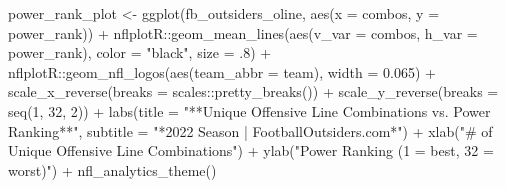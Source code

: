 \documentclass[
  letterpaper,
]{krantz}
\newenvironment{Shaded}{\begin{snugshade}}{\end{snugshade}}
\newcommand{\AttributeTok}[1]{\textcolor[rgb]{0.40,0.45,0.13}{#1}}
\newcommand{\DecValTok}[1]{\textcolor[rgb]{0.68,0.00,0.00}{#1}}
\newcommand{\FloatTok}[1]{\textcolor[rgb]{0.68,0.00,0.00}{#1}}
\newcommand{\FunctionTok}[1]{\textcolor[rgb]{0.28,0.35,0.67}{#1}}
\newcommand{\NormalTok}[1]{\textcolor[rgb]{0.00,0.23,0.31}{#1}}
\newcommand{\OtherTok}[1]{\textcolor[rgb]{0.00,0.23,0.31}{#1}}
\newcommand{\SpecialCharTok}[1]{\textcolor[rgb]{0.37,0.37,0.37}{#1}}
\newcommand{\StringTok}[1]{\textcolor[rgb]{0.13,0.47,0.30}{#1}}
\begin{document}
\begin{Shaded}
\begin{Highlighting}[]
\NormalTok{power\_rank\_plot }\OtherTok{\textless{}{-}} \FunctionTok{ggplot}\NormalTok{(fb\_outsiders\_oline,}
                          \FunctionTok{aes}\NormalTok{(}\AttributeTok{x =}\NormalTok{ combos, }\AttributeTok{y =}\NormalTok{ power\_rank)) }\SpecialCharTok{+}
\NormalTok{  nflplotR}\SpecialCharTok{::}\FunctionTok{geom\_mean\_lines}\NormalTok{(}\FunctionTok{aes}\NormalTok{(}\AttributeTok{v\_var =}\NormalTok{ combos,}
                                \AttributeTok{h\_var =}\NormalTok{ power\_rank),}
                            \AttributeTok{color =} \StringTok{"black"}\NormalTok{,}
                            \AttributeTok{size =}\NormalTok{ .}\DecValTok{8}\NormalTok{) }\SpecialCharTok{+}
\NormalTok{  nflplotR}\SpecialCharTok{::}\FunctionTok{geom\_nfl\_logos}\NormalTok{(}\FunctionTok{aes}\NormalTok{(}\AttributeTok{team\_abbr =}\NormalTok{ team), }\AttributeTok{width =} \FloatTok{0.065}\NormalTok{) }\SpecialCharTok{+}
  \FunctionTok{scale\_x\_reverse}\NormalTok{(}\AttributeTok{breaks =}\NormalTok{ scales}\SpecialCharTok{::}\FunctionTok{pretty\_breaks}\NormalTok{()) }\SpecialCharTok{+}
  \FunctionTok{scale\_y\_reverse}\NormalTok{(}\AttributeTok{breaks =} \FunctionTok{seq}\NormalTok{(}\DecValTok{1}\NormalTok{, }\DecValTok{32}\NormalTok{, }\DecValTok{2}\NormalTok{)) }\SpecialCharTok{+}
  \FunctionTok{labs}\NormalTok{(}\AttributeTok{title =} \StringTok{"**Unique Offensive Line Combinations vs.}
\StringTok{       Power Ranking**"}\NormalTok{,}
       \AttributeTok{subtitle =} \StringTok{"*2022 Season  |  FootballOutsiders.com*"}\NormalTok{) }\SpecialCharTok{+}
  \FunctionTok{xlab}\NormalTok{(}\StringTok{"\# of Unique Offensive Line Combinations"}\NormalTok{) }\SpecialCharTok{+}
  \FunctionTok{ylab}\NormalTok{(}\StringTok{"Power Ranking (1 = best, 32 = worst)"}\NormalTok{) }\SpecialCharTok{+}
  \FunctionTok{nfl\_analytics\_theme}\NormalTok{()}


\end{Highlighting}
\end{Shaded}
\end{document}
